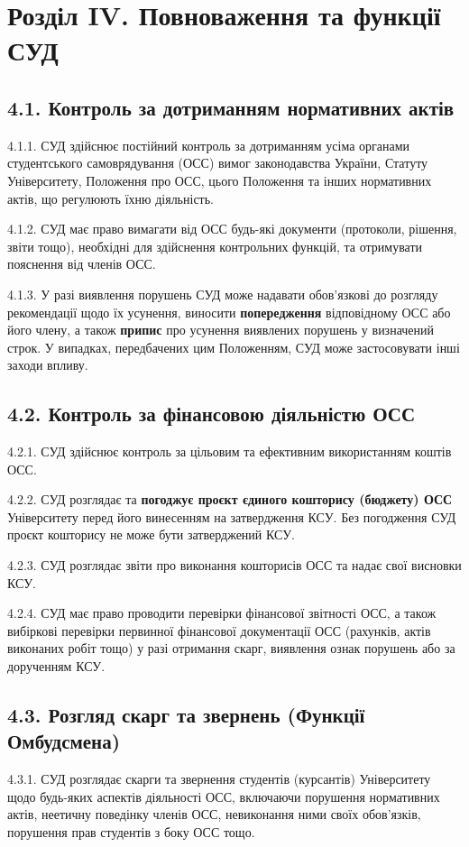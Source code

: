 \section*{Розділ IV. Повноваження та функції СУД}

\subsection*{4.1. Контроль за дотриманням нормативних актів}
    4.1.1. СУД здійснює постійний контроль за дотриманням усіма органами студентського самоврядування (ОСС) вимог законодавства України, Статуту Університету, Положення про ОСС, цього Положення та інших нормативних актів, що регулюють їхню діяльність.

    4.1.2. СУД має право вимагати від ОСС будь-які документи (протоколи, рішення, звіти тощо), необхідні для здійснення контрольних функцій, та отримувати пояснення від членів ОСС.

    4.1.3. У разі виявлення порушень СУД може надавати обов'язкові до розгляду рекомендації щодо їх усунення, виносити \textbf{попередження} відповідному ОСС або його члену, а також \textbf{припис} про усунення виявлених порушень у визначений строк. У випадках, передбачених цим Положенням, СУД може застосовувати інші заходи впливу.

\subsection*{4.2. Контроль за фінансовою діяльністю ОСС}
    4.2.1. СУД здійснює контроль за цільовим та ефективним використанням коштів ОСС.

    4.2.2. СУД розглядає та \textbf{погоджує проєкт єдиного кошторису (бюджету) ОСС} Університету перед його винесенням на затвердження КСУ. Без погодження СУД проєкт кошторису не може бути затверджений КСУ.

    4.2.3. СУД розглядає звіти про виконання кошторисів ОСС та надає свої висновки КСУ.

    4.2.4. СУД має право проводити перевірки фінансової звітності ОСС, а також вибіркові перевірки первинної фінансової документації ОСС (рахунків, актів виконаних робіт тощо) у разі отримання скарг, виявлення ознак порушень або за дорученням КСУ.

\subsection*{4.3. Розгляд скарг та звернень (Функції Омбудсмена)}
    4.3.1. СУД розглядає скарги та звернення студентів (курсантів) Університету щодо будь-яких аспектів діяльності ОСС, включаючи порушення нормативних актів, неетичну поведінку членів ОСС, невиконання ними своїх обов'язків, порушення прав студентів з боку ОСС тощо.

